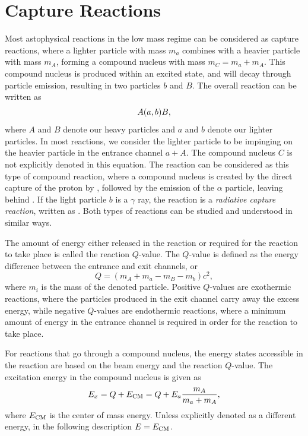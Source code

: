 
\section{Capture Reactions}
\label{sec:01-capture-reactions}

Most astophysical reactions in the low mass regime can be considered as capture
reactions, where a lighter particle with mass $m_a$ combines with a heavier
particle with mass $m_A$, forming a compound nucleus with mass
$m_C = m_a + m_A$. This compound nucleus is produced within an excited state,
and will decay through particle emission, resulting in two particles $b$ and
$B$. The overall reaction can be written as
\[
    A(a,b)B,
\]
where $A$ and $B$ denote our heavy particles and $a$ and $b$ denote our
lighter particles. In most reactions, we
consider the lighter particle to be impinging on the heavier particle in the
entrance channel $a + A$. The compound nucleus $C$ is not explicitly denoted
in this equation. The reaction \alpa{} can be considered as this type of
compound reaction, where a compound nucleus  is created by the
direct capture of the proton by , followed by the emission of the
$\alpha$ particle, leaving behind . If the light particle $b$ is a
$\gamma$ ray, the reaction is a \emph{radiative capture reaction}, written as
. Both types of reactions can be studied and understood in
similar ways.

The amount of energy either released in the reaction or required for the
reaction to take place is called the reaction $Q$-value. The $Q$-value is
defined as the energy difference between the entrance and exit channels, or
\[
    Q = (m_A + m_a - m_B - m_b)c^2,
\]
where $m_i$ is the mass of the denoted particle. Positive $Q$-values are
exothermic reactions, where the particles produced in the exit channel carry
away the excess energy, while negative $Q$-values are endothermic reactions,
where a minimum amount of energy in the entrance channel is required in order
for the reaction to take place.

For reactions that go through a compound nucleus, the energy states accessible
in the reaction are based on the beam energy and the reaction $Q$-value. The
excitation energy in the compound nucleus is given as
\[
    E_x = Q + E_{\rm CM} = Q + E_a\frac{m_A}{m_a + m_A},
\]
where $E_{\rm CM}$ is the center of mass energy. Unless explicitly denoted as
a different energy, in the following description $E = E_{\rm CM}$.


